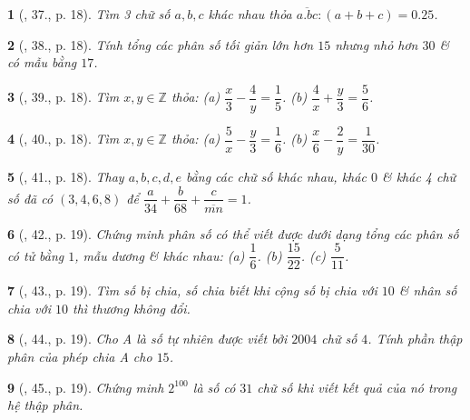 \documentclass{article}
\newtheorem{baitoan}{}
\begin{document}
\begin{baitoan}[\cite{Binh_Toan_6_tap_2}, 37., p. 18]
	Tìm 3 chữ số $a,b,c$ khác nhau thỏa $\overline{a.bc}:(a + b + c) = 0.25$.
\end{baitoan}

\begin{baitoan}[\cite{Binh_Toan_6_tap_2}, 38., p. 18]
	Tính tổng các phân số tối giản lớn hơn $15$ nhưng nhỏ hơn $30$ \& có mẫu bằng $17$.
\end{baitoan}

\begin{baitoan}[\cite{Binh_Toan_6_tap_2}, 39., p. 18]
	Tìm $x,y\in\mathbb{Z}$ thỏa: (a) $\dfrac{x}{3} - \dfrac{4}{y} = \dfrac{1}{5}$. (b) $\dfrac{4}{x} + \dfrac{y}{3} = \dfrac{5}{6}$.
\end{baitoan}

\begin{baitoan}[\cite{Binh_Toan_6_tap_2}, 40., p. 18]
	Tìm $x,y\in\mathbb{Z}$ thỏa: (a) $\dfrac{5}{x} - \dfrac{y}{3} = \dfrac{1}{6}$. (b) $\dfrac{x}{6} - \dfrac{2}{y} = \dfrac{1}{30}$.
\end{baitoan}

\begin{baitoan}[\cite{Binh_Toan_6_tap_2}, 41., p. 18]
	Thay $a,b,c,d,e$ bằng các chữ số khác nhau, khác $0$ \& khác 4 chữ số đã có $(3,4,6,8)$ để $\dfrac{a}{34} + \dfrac{b}{68} + \dfrac{c}{\overline{mn}} = 1$.
\end{baitoan}

\begin{baitoan}[\cite{Binh_Toan_6_tap_2}, 42., p. 19]
	Chứng minh phân số có thể viết được dưới dạng tổng các phân số có tử bằng $1$, mẫu dương \& khác nhau: (a) $\dfrac{1}{6}$. (b) $\dfrac{15}{22}$. (c) $\dfrac{5}{11}$.
\end{baitoan}

\begin{baitoan}[\cite{Binh_Toan_6_tap_2}, 43., p. 19]
	Tìm số bị chia, số chia biết khi cộng số bị chia với $10$ \& nhân số chia với $10$ thì thương không đổi.
\end{baitoan}

\begin{baitoan}[\cite{Binh_Toan_6_tap_2}, 44., p. 19]
	Cho A là số tự nhiên được viết bởi $2004$ chữ số $4$. Tính phần thập phân của phép chia A cho $15$.
\end{baitoan}

\begin{baitoan}[\cite{Binh_Toan_6_tap_2}, 45., p. 19]
	Chứng minh $2^{100}$ là số có $31$ chữ số khi viết kết quả của nó trong hệ thập phân.
\end{baitoan}
\end{document}
